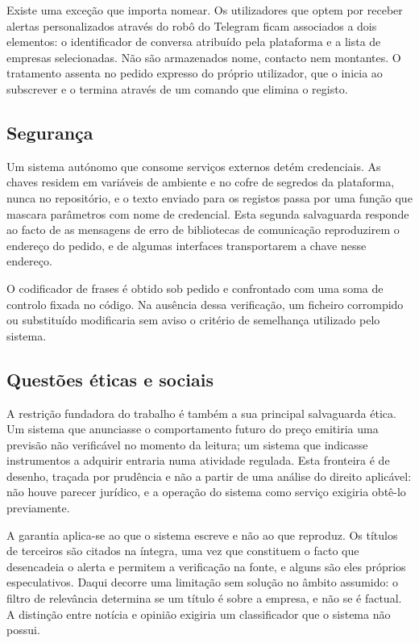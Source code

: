 Existe uma exceção que importa nomear. Os utilizadores que optem por receber alertas personalizados
através do robô do Telegram ficam associados a dois elementos: o identificador de conversa
atribuído pela plataforma e a lista de empresas selecionadas. Não são armazenados nome, contacto
nem montantes. O tratamento assenta no pedido expresso do próprio utilizador, que o inicia ao
subscrever e o termina através de um comando que elimina o registo.

\subsection{Segurança}
\label{sec:met_seguranca}

Um sistema autónomo que consome serviços externos detém credenciais. As chaves residem em variáveis
de ambiente e no cofre de segredos da plataforma, nunca no repositório, e o texto enviado para os
registos passa por uma função que mascara parâmetros com nome de credencial. Esta segunda
salvaguarda responde ao facto de as mensagens de erro de bibliotecas de comunicação reproduzirem o
endereço do pedido, e de algumas interfaces transportarem a chave nesse endereço.

O codificador de frases é obtido sob pedido e confrontado com uma soma de controlo fixada no
código. Na ausência dessa verificação, um ficheiro corrompido ou substituído modificaria sem aviso
o critério de semelhança utilizado pelo sistema.

\subsection{Questões éticas e sociais}
\label{sec:met_etica}

A restrição fundadora do trabalho é também a sua principal salvaguarda ética. Um sistema que
anunciasse o comportamento futuro do preço emitiria uma previsão não verificável no momento da
leitura; um sistema que indicasse instrumentos a adquirir entraria numa atividade regulada. Esta
fronteira é de desenho, traçada por prudência e não a partir de uma análise do direito aplicável:
não houve parecer jurídico, e a operação do sistema como serviço exigiria obtê-lo previamente.

A garantia aplica-se ao que o sistema escreve e não ao que reproduz. Os títulos de terceiros são
citados na íntegra, uma vez que constituem o facto que desencadeia o alerta e permitem a
verificação na fonte, e alguns são eles próprios especulativos. Daqui decorre uma limitação sem
solução no âmbito assumido: o filtro de relevância determina se um título é sobre a empresa, e não
se é factual. A distinção entre notícia e opinião exigiria um classificador que o sistema não
possui.

